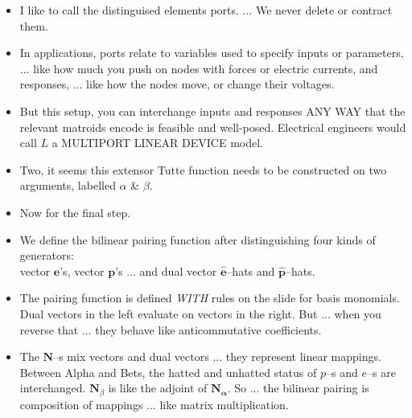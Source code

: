 \documentclass[14pt]{extarticle}
\begin{document}
{\begin{itemize}
\item
  I like to call the distinguised elements ports. ... We never delete or contract them.


\item In applications, ports relate to variables used to specify inputs
  or parameters, ... like how much you push on nodes with forces or electric currents,
  and responses, ... like how the nodes move, or change their voltages.

\item But this setup, you can interchange inputs and responses ANY WAY that the
  relevant matroids encode is feasible and well-posed.  Electrical engineers would
  call $L$ a MULTIPORT LINEAR DEVICE model.


\item
  Two, it seems this extensor Tutte function needs to be constructed on 
  two arguments, labelled $\alpha$ \& $\beta$.


\item Now for the final step.

\item
  We define the bilinear pairing function 
  after distinguishing  
  four kinds of generators:\\
  vector $\mathbf{e}$'s, vector $\mathbf{p}$'s ... and
dual vector $\widehat{\mathbf{e}}$--hats and $\widehat{\mathbf{p}}$--hats.  

\item
  The pairing function is defined \emph{WITH} rules on the slide for basis monomials.  Dual vectors
  in the left evaluate on vectors in the right.   But ... when you reverse that ... 
  they behave like anticommutative coefficients.

\item
  The $\mathbf{N}$--s mix vectors and dual vectors ... they represent linear mappings.
  Between Alpha and Bets, the hatted and unhatted status of $p$--s and $e$--s are interchanged.
  $\mathbf{N}_\beta$ is like the adjoint of $\mathbf{N_\alpha}$.  So ... the
  bilinear pairing is composition of mappings  ... like matrix multiplication.


\end{itemize}}
\end{document}
